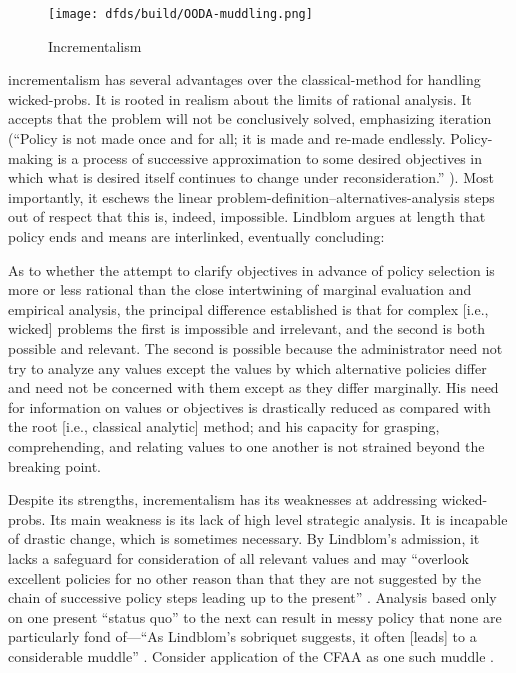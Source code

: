 \begin{figure}[h]
  \centering\CaptionFontSize
  \texttt{[image: dfds/build/OODA-muddling.png]}
  \caption{Incrementalism}
  \label{fig-muddling-through}
\end{figure}

\Ac{incrementalism} has several advantages over the \ac{classical-method} for handling \acp{wicked-prob}. It is rooted
in realism about the limits of rational analysis. It accepts that the problem will not be conclusively solved,
emphasizing iteration (``Policy is not made once and for all; it is made and re-made endlessly. Policy-making is a
process of successive approximation to some desired objectives in which what is desired itself continues to change under
reconsideration.'' \cite{lindblom_muddling_1959}). Most importantly, it eschews the linear
problem-definition--alternatives-analysis steps out of respect that this is, indeed, impossible. Lindblom argues at
length that policy ends and means are interlinked, eventually concluding:

\begin{displayquote}
As to whether the attempt to clarify objectives in advance of policy selection is more or less rational than the close
intertwining of marginal evaluation and empirical analysis, the principal difference established is that for complex
[i.e., wicked] problems the first is impossible and irrelevant, and the second is both possible and relevant. The second
is possible because the administrator need not try to analyze any values except the values by which alternative policies
differ and need not be concerned with them except as they differ marginally. His need for information on values or
objectives is drastically reduced as compared with the root [i.e., classical analytic] method; and his capacity for
grasping, comprehending, and relating values to one another is not strained beyond the breaking point.
\cite{lindblom_muddling_1959}
\end{displayquote}

Despite its strengths, \ac{incrementalism} has its weaknesses at addressing \acp{wicked-prob}. Its main weakness is its
lack of high level strategic analysis. It is incapable of drastic change, which is sometimes necessary. By Lindblom's
admission, it lacks a safeguard for consideration of all relevant values and may ``overlook excellent policies for no
other reason than that they are not suggested by the chain of successive policy steps leading up to the present''
\cite{lindblom_muddling_1959}. Analysis based only on one present ``status quo'' to the next can result in messy policy
that none are particularly fond of---``As Lindblom's sobriquet suggests, it often [leads] to a considerable muddle''
\cite{feeley_judicial_2000}. Consider application of the \acl{CFAA} as one such muddle \cite{wolff_computer_2016}.

